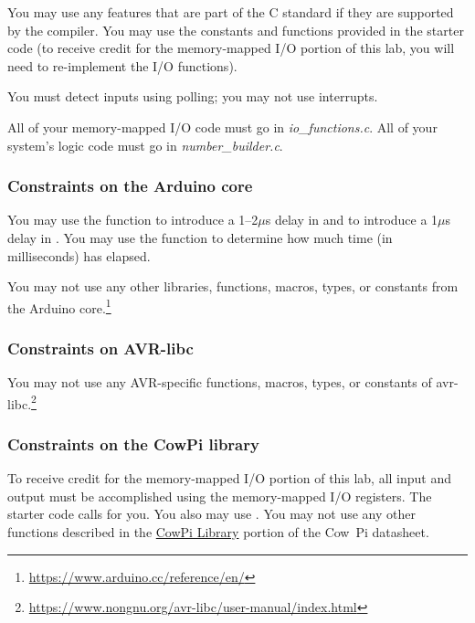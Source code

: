 You may use any features that are part of the C standard if they are supported by the compiler.
You may use the constants and functions provided in the starter code
(to receive credit for the memory-mapped I/O portion of this lab, you will need to re-implement the I/O functions).

You must detect inputs using polling;
you may not use interrupts.

All of your memory-mapped I/O code must go in \textit{io\_functions.c}.
All of your system's logic code must go in \textit{number\_builder.c}.

\subsubsection{Constraints on the Arduino core}

You may use the  function to introduce a 1--2$\mu$s delay in  and to introduce a 1$\mu$s delay in .
You may use the  function to determine how much time (in milliseconds) has elapsed.

You may not use any other libraries, functions, macros, types, or constants from the Arduino core.\footnote{\url{https://www.arduino.cc/reference/en/}}

\subsubsection{Constraints on AVR-libc}

You may not use any AVR-specific functions, macros, types, or constants of avr-libc.\footnote{\url{https://www.nongnu.org/avr-libc/user-manual/index.html}}

\subsubsection{Constraints on the CowPi library}

To receive credit for the memory-mapped I/O portion of this lab, all input and
output must be accomplished using the memory-mapped I/O registers.
The starter code calls  for you.
You also may use \href{https://cow-pi.readthedocs.io/en/latest/CowPi/inputs.html#debouncing}{}.
You may not use any other functions described in the \href{https://cow-pi.readthedocs.io/en/latest/library.html}{CowPi Library} portion of the Cow~Pi datasheet.

